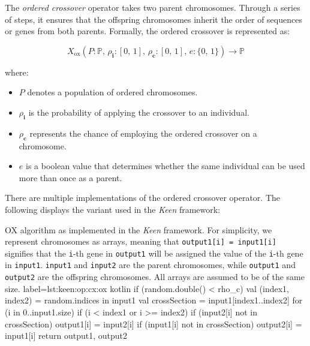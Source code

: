 \begin{definition}
    The \textit{ordered crossover} operator takes two parent chromosomes. Through a series of steps, it ensures that 
    the offspring chromosomes inherit the order of sequences or genes from both parents. Formally, the ordered 
    crossover is represented as:

    \begin{equation}
        X_\mathrm{ox}(P: \mathbb{P},\, \rho_\textbf{i}: [0,\, 1],\, \rho_\mathbf{c}: [0,\, 1],\, e: \{0,\, 1\}) 
            \to \mathbb{P}
    \end{equation}

    where:

    \begin{itemize}
    \item \(P\) denotes a population of ordered chromosomes.
    \item \(\rho_\textbf{i}\) is the probability of applying the crossover to an individual.
    \item \(\rho_\mathbf{c}\) represents the chance of employing the ordered crossover on a chromosome.
    \item \(e\) is a boolean value that determines whether the same individual can be used more than once as a parent.
    \end{itemize}
\end{definition}

There are multiple implementations of the ordered crossover operator. The following displays the variant used in the \textit{Keen} framework:

\begin{code}{
    OX algorithm as implemented in the \textit{Keen} framework. For simplicity, we represent chromosomes as arrays, 
    meaning that \texttt{output1[i] = input1[i]} signifies that the \texttt{i}-th gene in \texttt{output1} will be
    assigned the value of the \texttt{i}-th gene in \texttt{input1}. \texttt{input1} and \texttt{input2} are the parent 
    chromosomes, while \texttt{output1} and \texttt{output2} are the offspring chromosomes. All arrays are assumed to
    be of the same size.
}{
    label={lst:keen:op:cx:ox}
}{kotlin}
    if (random.double() < rho_c) {
        val (index1, index2) = random.indices in input1
        val crossSection = input1[index1..index2]
        for (i in 0..input1.size) {
            if (i < index1 or i >= index2) {
                if (input2[i] not in crossSection) {
                    output1[i] = input2[i]
                }
                if (input1[i] not in crossSection) {
                    output2[i] = input1[i]
                }
            }
        }
        return output1, output2
    }
\end{code}


